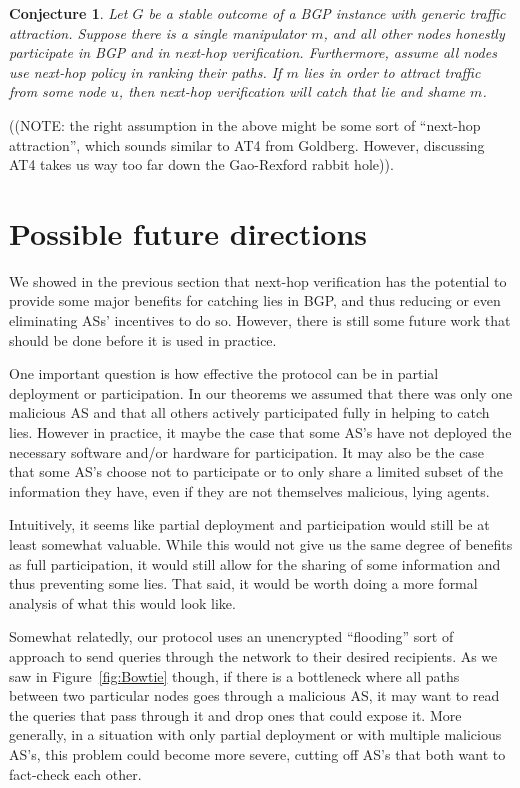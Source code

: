 \documentclass[10pt]{article}
\newtheorem{conjecture}{Conjecture}
\begin{document}
  \begin{conjecture}
    Let $G$ be a stable outcome of a BGP instance with generic traffic attraction.
    Suppose there is a single manipulator $m$,
    and all other nodes honestly participate in BGP and in next-hop verification.
    Furthermore, assume all nodes use next-hop policy in ranking their paths.
    If $m$ lies in order to attract traffic from some node $u$,
    then next-hop verification will catch that lie and shame $m$.
  \end{conjecture}
  ((NOTE: the right assumption in the above might be some sort of ``next-hop
  attraction'', which sounds similar to AT4 from Goldberg. However, discussing AT4 
  takes us way too far down the Gao-Rexford rabbit hole)).


\section{Possible future directions}
We showed in the previous section that next-hop verification has the potential to provide some major benefits for catching lies in BGP, and thus reducing or even eliminating ASs' incentives to do so. However, there is still some future work that should be done before it is used in practice.

One important question is how effective the protocol can be in partial deployment or participation. In our theorems we assumed that there was only one malicious AS and that all others actively participated fully in helping to catch lies. However in practice, it maybe the case that some AS's have not deployed the necessary software and/or hardware for participation. It may also be the case that some AS's choose not to participate or to only share a limited subset of the information they have, even if they are not themselves malicious, lying agents.

Intuitively, it seems like partial deployment and participation would still be at least somewhat valuable. While this would not give us the same degree of benefits as full participation, it would still allow for the sharing of some information and thus preventing some lies. That said, it would be worth doing a more formal analysis of what this would look like.

Somewhat relatedly, our protocol uses an unencrypted ``flooding'' sort of approach to send queries through the network to their desired recipients. As we saw in Figure~\ref{fig:Bowtie} though, if there is a bottleneck where all paths between two particular nodes goes through a malicious AS, it may want to read the queries that pass through it and drop ones that could expose it. More generally, in a situation with only partial deployment or with multiple malicious AS's, this problem could become more severe, cutting off AS's that both want to fact-check each other.
\end{document}
